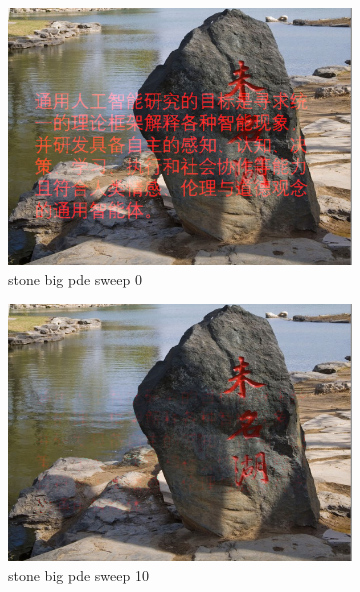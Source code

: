 \documentclass[11pt]{article}
\begin{document}
\begin{figure}[ht!]
    \centering
    \hfill%
    \begin{subfigure}[]{0.333\linewidth}
        \centering
        \includegraphics[width=\linewidth]{fig/restoration/stone_big/pde_0.jpg}
        \caption{stone big pde sweep 0}
    \end{subfigure}%
    \hfill%
    \begin{subfigure}[]{0.333\linewidth}
        \centering
        \includegraphics[width=\linewidth]{fig/restoration/stone_big/pde_10.jpg}
        \caption{stone big pde sweep 10}
    \end{subfigure}%
    \hfill%
    \begin{subfigure}[]{0.333\linewidth}

\end{subfigure}
\end{figure}
\end{document}
